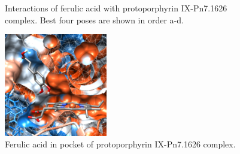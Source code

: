 \documentclass[12pt]{article}
\begin{document}
\begin{figure}[h!]
\begin{subfigure}[h!]{0.35\textwidth}
			\caption{}
		\end{subfigure}
		\hfill
		\caption[Interactions between ferulic acid and protoporphyrin IX-Pn7.1626 complex.]{Interactions of ferulic acid with protoporphyrin IX-Pn7.1626 complex. Best four poses are shown in order a-d.}
		\label{fig5p_5}
	\end{figure}
	\FloatBarrier
	
	\FloatBarrier
	\begin{figure}[h!]
		\centering
		\includegraphics[width=0.4\textwidth]{../5/propose/Dock/Dock2/chimera.png}
		\caption{Ferulic acid in pocket of protoporphyrin IX-Pn7.1626 complex.}
		\label{fig5p_6}
	\end{figure}
	\FloatBarrier

	\newpage
	
	
	
	
	\newpage
	\tableofcontents
	\listoffigures
	\listoftables
	
\end{document}
